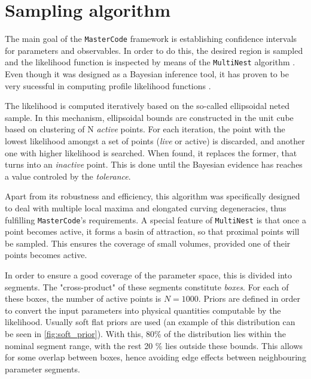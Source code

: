 \section{Sampling algorithm}
The main goal of the \texttt{MasterCode} framework is establishing confidence intervals for parameters and observables. In order to do this, the desired region is sampled and the likelihood function is inspected by means of the \texttt{MultiNest} algorithm . Even though it was designed as a Bayesian inference tool, it has proven to be very sucessful in computing profile likelihood functions . 

The likelihood is computed iteratively based on the so-called ellipsoidal neted sample. In this mechanism, ellipsoidal bounds are constructed in the unit cube based on clustering of N \textit{active} points. For each iteration, the point  with the lowest likelihood amongst a set of points (\textit{live} or active) is discarded, and another one with higher likelihood is searched. When found, it replaces the former, that turns into an \textit{inactive} point. This is done until the Bayesian evidence has reaches a value controled by the \textit{tolerance}.
 
Apart from its robustness and efficiency, this algorithm was specifically designed to deal with multiple local maxima and elongated curving degeneracies, thus fulfilling \texttt{MasterCode}'s requirements. A special feature of \texttt{MultiNest} is that once a point becomes active, it forms a basin of attraction, so that proximal points will be sampled. This ensures the coverage of small volumes, provided one of their points becomes active. 

In order to ensure a good coverage of the parameter space, this is divided into segments. The "cross-product" of these segments constitute \textit{boxes}. For each of these boxes, the number of active points is $N = 1000$. Priors are defined in order to convert the input parameters into physical quantities computable by the likelihood. Usually soft flat priors are used (an example of this distribution can be seen in \ref{fig:soft_prior}). With this, 80\% of the distribution lies within the nominal segment range, with the rest 20 \% lies outside these bounds. This allows for some overlap between boxes, hence avoiding edge effects between neighbouring parameter segments. 

